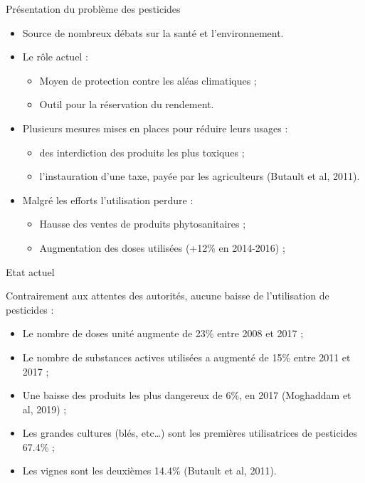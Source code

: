 \documentclass[11pt,ignorenonframetext,]{beamer}
\providecommand{\tightlist}{%
  \setlength{\itemsep}{0pt}\setlength{\parskip}{0pt}}
\begin{document}
\begin{frame}{Présentation du problème des pesticides}
\protect\hypertarget{presentation-du-probleme-des-pesticides}{}

\begin{itemize}
\tightlist
\item
  Source de nombreux débats sur la santé et l'environnement.
\item
  Le rôle actuel :

  \begin{itemize}
  \tightlist
  \item
    Moyen de protection contre les aléas climatiques ;
  \item
    Outil pour la réservation du rendement.
  \end{itemize}
\item
  Plusieurs mesures mises en places pour réduire leurs usages :

  \begin{itemize}
  \tightlist
  \item
    des interdiction des produits les plus toxiques ;
  \item
    l'instauration d'une taxe, payée par les agriculteurs (Butault et
    al, 2011).
  \end{itemize}
\item
  Malgré les efforts l'utilisation perdure :

  \begin{itemize}
  \tightlist
  \item
    Hausse des ventes de produits phytosanitaires ;
  \item
    Augmentation des doses utilisées (+12\% en 2014-2016) ;
  \end{itemize}
\end{itemize}

\end{frame}

\begin{frame}{Etat actuel}
\protect\hypertarget{etat-actuel}{}

Contrairement aux attentes des autorités, aucune baisse de l'utilisation
de pesticides :

\begin{itemize}
\tightlist
\item
  Le nombre de doses unité augmente de 23\% entre 2008 et 2017 ;
\item
  Le nombre de substances actives utilisées a augmenté de 15\% entre
  2011 et 2017 ;
\item
  Une baisse des produits les plus dangereux de 6\%, en 2017 (Moghaddam
  et al, 2019) ;
\item
  Les grandes cultures (blés, etc\ldots{}) sont les premières
  utilisatrices de pesticides 67.4\% ;
\item
  Les vignes sont les deuxièmes 14.4\% (Butault et al, 2011).
\end{itemize}

\end{frame}
\end{document}
